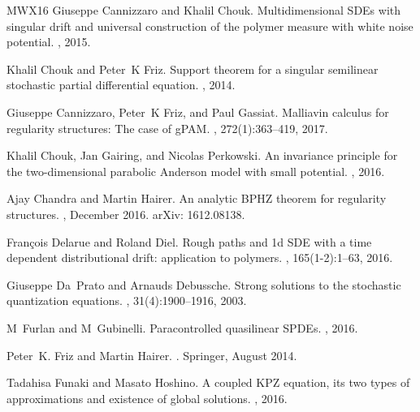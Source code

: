 \documentclass[a4paper, 11pt]{article}
\begin{document}
\begin{thebibliography}{MWX16}
Giuseppe Cannizzaro and Khalil Chouk.
\newblock Multidimensional {SDE}s with singular drift and universal
  construction of the polymer measure with white noise potential.
, 2015.

Khalil Chouk and Peter~K Friz.
\newblock Support theorem for a singular semilinear stochastic partial
  differential equation.
, 2014.

Giuseppe Cannizzaro, Peter~K Friz, and Paul Gassiat.
\newblock Malliavin calculus for regularity structures: The case of {gPAM}.
, 272(1):363--419, 2017.

Khalil Chouk, Jan Gairing, and Nicolas Perkowski.
\newblock An invariance principle for the two-dimensional parabolic {A}nderson
  model with small potential.
, 2016.

Ajay Chandra and Martin Hairer.
\newblock An analytic {BPHZ} theorem for regularity structures.
, December 2016.
\newblock arXiv: 1612.08138.

Fran{\c{c}}ois Delarue and Roland Diel.
\newblock Rough paths and 1d {SDE} with a time dependent distributional drift:
  application to polymers.
, 165(1-2):1--63, 2016.

Giuseppe Da~Prato and Arnauds Debussche.
\newblock Strong solutions to the stochastic quantization equations.
, 31(4):1900--1916, 2003.

M~Furlan and M~Gubinelli.
\newblock Paracontrolled quasilinear {SPDE}s.
, 2016.

Peter~K. Friz and Martin Hairer.
.
\newblock Springer, August 2014.

Tadahisa Funaki and Masato Hoshino.
\newblock A coupled {KPZ} equation, its two types of approximations and
  existence of global solutions.
, 2016.


\end{thebibliography}
\end{document}
